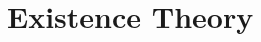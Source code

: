 \documentclass[../main]{subfiles}
\begin{document}
\chapter{Existence Theory}\label{ch09}








\end{document}
